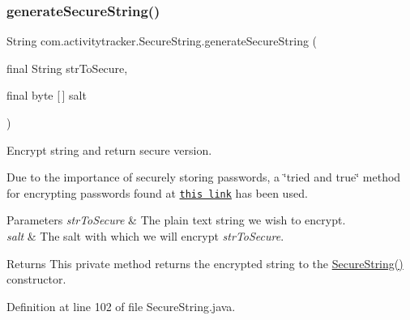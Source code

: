 \subsubsection{\texorpdfstring{generate\+Secure\+String()}{generateSecureString()}}
{\footnotesize\ttfamily String com.\+activitytracker.\+Secure\+String.\+generate\+Secure\+String (\begin{DoxyParamCaption}\item[{final String}]{str\+To\+Secure,  }\item[{final byte \mbox{[}$\,$\mbox{]}}]{salt }\end{DoxyParamCaption})\hspace{0.3cm}{\ttfamily [private]}}

Encrypt string and return secure version.

Due to the importance of securely storing passwords, a \char`\"{}tried and true\char`\"{} method for encrypting passwords found at \href{https://howtodoinjava.com/security/how-to-generate-secure-password-hash-md5-sha-pbkdf2-bcrypt-examples/}{\tt this link} has been used.


\begin{DoxyParams}{Parameters}
{\em str\+To\+Secure} & The plain text string we wish to encrypt. \\
\hline
{\em salt} & The salt with which we will encrypt {\itshape str\+To\+Secure}.\\
\hline
\end{DoxyParams}
\begin{DoxyReturn}{Returns}
This private method returns the encrypted string to the \mbox{\hyperlink{classcom_1_1activitytracker_1_1_secure_string_a889fcbf0c1f771962ac81886f49e389e}{Secure\+String()}} constructor. 
\end{DoxyReturn}


Definition at line 102 of file Secure\+String.\+java.


